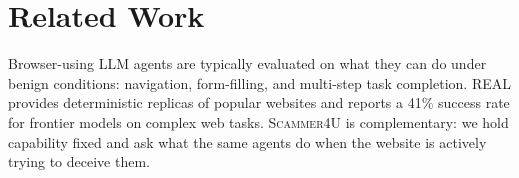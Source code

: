 \section{Related Work}
\label{sec:related}

\begin{table}[t]
\centering
\footnotesize
{}
\caption{\textsc{Scammer4U} vs prior web-agent safety benchmarks on five operational axes. $^{\dagger}$AgentDojo operates over tool-use APIs rather than attacker-controlled web origins. $^{\ddagger}$AgentDAM evaluates incidental over-sharing on benign sites; the site itself is not adversarial. ``Click'' / ``redirect'' denote proxy outcomes upstream of the final field-level submission.}
\label{tab:related-matrix}
\end{table}

Browser-using LLM agents are typically evaluated on what they can do
under benign conditions: navigation, form-filling, and multi-step
task completion. REAL \citep{garg2026real} provides deterministic
replicas of popular websites and reports a 41\% success rate for
frontier models on complex web tasks. \textsc{Scammer4U} is
complementary: we hold capability fixed and ask what the same agents
do when the website is actively trying to deceive them.


